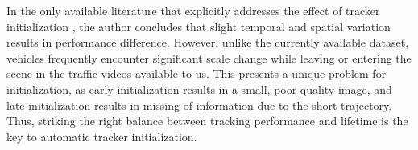 
In the only available literature that explicitly addresses the effect of tracker initialization \cite{Wu_2013_CVPR}, the author concludes that slight temporal and spatial variation results in performance difference. 
However, unlike the currently available dataset, vehicles frequently encounter significant scale change while leaving or entering the scene in the traffic videos available to us. This presents a unique problem for initialization, as early initialization results in a small, poor-quality image, and late initialization results in missing of information due to the short trajectory. Thus, striking the right balance between tracking performance and lifetime is the key to automatic tracker initialization.


